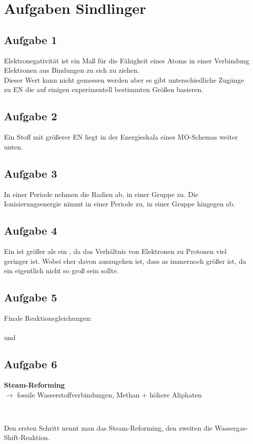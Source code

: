 \documentclass[a4paper]{article}
\begin{document}
\section*{Aufgaben Sindlinger}
\subsection*{Aufgabe 1}
Elektronegativität ist ein Maß für die Fähigkeit eines Atoms in einer Verbindung Elektronen aus Bindungen zu sich zu ziehen.\\
Dieser Wert kann nicht gemessen werden aber es gibt unterschiedliche Zugänge zu EN die auf einigen experimentell bestimmten Größen basieren.\\
\subsection*{Aufgabe 2}
Ein Stoff mit größerer EN liegt in der Energieskala eines MO-Schemas weiter unten.
\subsection*{Aufgabe 3}
In einer Periode nehmen die Radien ab, in einer Gruppe zu.
Die Ionisierungsenergie nimmt in einer Periode zu, in einer Gruppe hingegen ab.
\subsection*{Aufgabe 4}
Ein  ist größer als ein , da das Verhältnis von Elektronen zu Protonen viel geringer ist. Wobei eher davon auszugehen ist, dass as  immernoch größer ist, da ein  eigentlich nicht so groß sein sollte.
\subsection*{Aufgabe 5}
Finale Reaktionsgleichungen:\\
\\
und\\
\subsection*{Aufgabe 6}
\textbf{Steam-Reforming}\\
$\rightarrow$ fossile Wasserstoffverbindungen, Methan + höhere Aliphaten\\
\begin{center}
\\
\end{center}
Den ersten Schritt nennt man das Steam-Reforming, den zweiten die Wassergas-Shift-Reaktion.
\end{document}
